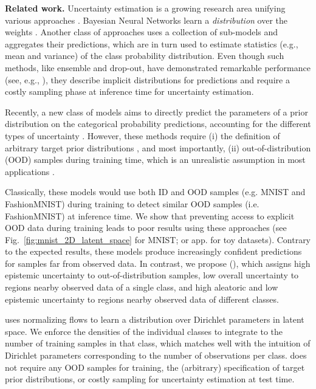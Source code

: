 \textbf{Related work.} Uncertainty estimation is a growing research area unifying various approaches \cite{uncertainty_on_weigths, simple_baseline_uncertainty, practical_deep_bayesian_principles, power_certainty, ensemble_simple, drop_out}. Bayesian Neural Networks learn a \emph{distribution} over the weights \cite{uncertainty_on_weigths, simple_baseline_uncertainty, practical_deep_bayesian_principles}. Another class of approaches uses a collection of sub-models and aggregates their predictions, which are in turn used to estimate statistics (e.g., mean and variance) of the class probability distribution. Even though such methods, like ensemble and drop-out, have demonstrated remarkable performance (see, e.g., \cite{uncertainty_survey}), they describe implicit distributions for predictions and require a costly sampling phase at inference time for uncertainty estimation. 

Recently, a new class of models aims to directly predict the parameters of a prior distribution on the categorical probability predictions, accounting for the different types of uncertainty \cite{prior_net, rev_kl_prior_net, evidential_uncertainty, uncertainty_time}. However, these methods require (i) the definition of arbitrary target prior distributions \cite{prior_net, rev_kl_prior_net, evidential_uncertainty}, and most importantly, (ii) out-of-distribution (OOD) samples during training time, which is an unrealistic assumption in most applications \cite{prior_net, rev_kl_prior_net}.

Classically, these models would use both ID and OOD samples (e.g. MNIST and FashionMNIST) during training to detect similar OOD samples (i.e. FashionMNIST) at inference time. We show that preventing access to explicit OOD data during training leads to poor results using these approaches (see Fig.~\ref{fig:mnist_2D_latent_space} for MNIST; or app. for toy datasets). Contrary to the expected results, these models produce increasingly confident predictions for samples far from observed data. In contrast, we propose \ours (\oursacro), which assigns high epistemic uncertainty to out-of-distribution samples, low overall uncertainty to regions nearby observed data of a single class, and high aleatoric and low epistemic uncertainty to regions nearby observed data of different classes.

\oursacro uses normalizing flows to learn a distribution over Dirichlet parameters in latent space. We enforce the densities of the individual classes to integrate to the number of training samples in that class, which matches well with the intuition of Dirichlet parameters corresponding to the number of observations per class. \oursacro does not require any OOD samples for training, the (arbitrary) specification of target prior distributions, or costly sampling for uncertainty estimation at test time.
